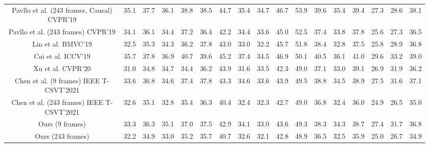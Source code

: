 \documentclass[journal]{IEEEtran}
\begin{document}
\begin{table*}[t]
{{\begin{tabular}{|ccccccccccccccccc|}
			Pavllo et al.  \cite{20183D} (243 frames, Causal) CVPR’19 & 35.1          & 37.7          & 36.1          & 38.8          & 38.5          & 44.7          & 35.4          & 34.7          & 46.7          & 53.9          & 39.6          & 35.4          & 39.4          & 27.3          & 28.6          & 38.1          \\
			Pavllo et al.   \cite{20183D} (243 frames) CVPR’19         & 34.1 & 36.1  & 34.4 & 37.2  & 36.4  & 42.2  & 34.4 & 33.6   & 45.0 & 52.5  & 37.4  & 33.8 & 37.8   & 25.6 & 27.3   & 36.5 \\
			Lin et al.  \cite{2019Lin} BMVC’19            & 32.5 & 35.3  & 34.3 & 36.2  & 37.8  & 43.0  & 33.0 & 32.2   & 45.7 & 51.8  & 38.4  & 32.8 & 37.5   & 25.8 & 28.9   & 36.8 \\
			Cai et al.  \cite{9009459} ICCV’19            & 35.7 & 37.8  & 36.9 & 40.7  & 39.6  & 45.2  & 37.4 & 34.5   & 46.9 & 50.1  & 40.5  & 36.1 & 41.0   & 29.6 & 33.2   & 39.0 \\
			Xu et al. \cite{2020Deep} CVPR’20                              & 31.0          & 34.8          & 34.7          & 34.4          & 36.2          & 43.9          & 31.6          & 33.5          & 42.3          & 49.0          & 37.1          & 33.0          & 39.1          & 26.9          & 31.9          & 36.2          \\
			Chen et al.  \cite{2020Anatomy} (9 frames) IEEE T-CSVT'2021 & 33.6 & 36.8  & 34.6 & 37.4  & 37.8  & 43.3  & 34.6 & 33.6   & 43.9 & 49.5  & 38.8  & 34.5 & 38.9   & 27.5 & 31.6   & 37.1 \\ 
			Chen et al. \cite{2020Anatomy} (243 frames) IEEE T-CSVT'2021 & 32.6          & 35.1          & 32.8          & 35.4          & 36.3          & 40.4          & 32.4          & 32.3          & 42.7          & 49.0          & 36.8          & 32.4          & 36.0          & 24.9          & 26.5          & 35.0          \\ \hline
			Ours (9 frames)      & 33.3          & 36.3          & 35.1          & 37.0          & 37.5          & 42.9          & 34.1          & 33.0          & 43.6         & 49.3          & 38.3          & 34.3          & 38.7          & 27.4          & 31.7          & 36.8          \\ 
			Ours (243 frames)                              & 32.2          & 34.9          & 33.0          & 35.2          & 35.7          & 40.7          & 32.6          & 32.1          & 42.8          & 48.9          & 36.5          & 32.5          & 35.9          & 25.0          & 26.7          & 34.9          \\

\end{tabular}}}
\end{table*}
\end{document}

